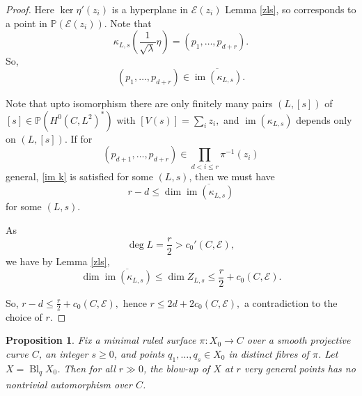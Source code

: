 \documentclass[11pt,letterpaper]{amsart}
\newtheorem{proposition}[lemma]{Proposition}
\begin{document}
\begin{proof}
Here $\ker\eta'(z_i)$ is a hyperplane in $\mathcal{E}(z_i)$ Lemma \ref{zls}, so corresponds to a point in $\mathbb{P}(\mathcal{E}(z_i))$. Note that
\[
\kappa_{L,s}\!\left(\frac{1}{\sqrt{\lambda}}\eta\right)
=(p_1,\ldots,p_{d+r}).
\]
So,
\begin{equation}\label{im k}
(p_1,\ldots,p_{d+r})\in \overline{\operatorname{im}(\kappa_{L,s})}.
\end{equation}

Note that upto isomorphism there are only finitely many pairs $(L,[s])$
of $[s]\in \mathbb{P}\!\left(H^0(C,L^2)^*\right)$
with $[V(s)]=\sum_i z_i,$
and \(\operatorname{im}(\kappa_{L,s})\) depends only on \((L,[s])\). If for
\[
(p_{d+1},\ldots,p_{d+r})
\in
\prod_{d<i\le r}\pi^{-1}(z_i)
\]
general, \eqref{im k} is satisfied for some \((L,s)\), then we must have
\[
r-d
\le
\dim\overline{\operatorname{im}(\kappa_{L,s})}
\]
for some \((L,s)\).

As
\[
\deg L=\frac r2>c_0'(C,\mathcal{E}),
\]
we have by Lemma \ref{zls},
\[
\dim\overline{\operatorname{im}(\kappa_{L,s})}
\le
\dim Z_{L,s}
\le
\frac r2+c_0(C,\mathcal{E}).
\]

So, $r-d
\le
\frac r2+c_0(C,\mathcal{E}),$
hence $r
\le
2d+2c_0(C,\mathcal{E}),$ a
contradiction to the choice of \(r\).
\end{proof}
\begin{proposition}\label{propo2}
Fix a minimal ruled surface $\pi:X_0\to C$ over a smooth projective curve $C$, an integer $s\ge0$, and points $q_1,\ldots,q_s\in X_0$ in distinct fibres of $\pi$. Let $X=\operatorname{Bl}_{\underline{q}}X_0$. Then for all $r\gg0$, the blow-up of $X$ at $r$ very general points has no nontrivial automorphism over $C$.
\end{proposition}
\end{document}
